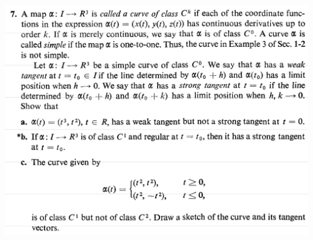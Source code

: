 \documentclass{report}
\begin{document}
\begin{question}{}{}
\includegraphics[height=14cm,width=18cm]{qu4}
\end{question}
\end{document}
